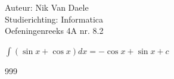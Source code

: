 \documentclass[a4paper]{article}
\newcommand{\bint}{\displaystyle\int}
\begin{document}
  
\noindent \large Auteur: Nik Van Daele \\
\noindent \large Studierichting: Informatica\\
\noindent \large Oefeningenreeks 4A nr. 8.2\\

\medskip

\normalsize

$\bint (\sin x + \cos x)dx = -\cos x + \sin x + c$\\

\begin{thebibliography}{999}
\end{thebibliography}
\end{document}
